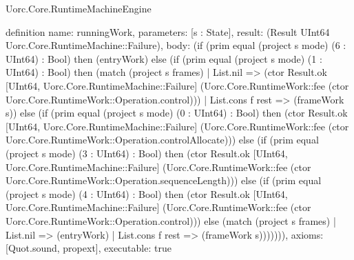 \begin{lexlean}{Uorc.Core.RuntimeMachineEngine}
\begin{semanticmodule}
definition{
  name: runningWork,
  parameters: [s : State],
  result: (Result UInt64 Uorc.Core.RuntimeMachine::Failure),
  body: (if (prim equal (project s mode) (6 : UInt64) : Bool) then (entryWork) else (if (prim equal (project s mode) (1 : UInt64) : Bool) then (match (project s frames)
    | List.nil => (ctor Result.ok [UInt64, Uorc.Core.RuntimeMachine::Failure] (Uorc.Core.RuntimeWork::fee (ctor Uorc.Core.RuntimeWork::Operation.control)))
    | List.cons f rest => (frameWork s)) else (if (prim equal (project s mode) (0 : UInt64) : Bool) then (ctor Result.ok [UInt64, Uorc.Core.RuntimeMachine::Failure] (Uorc.Core.RuntimeWork::fee (ctor Uorc.Core.RuntimeWork::Operation.controlAllocate))) else (if (prim equal (project s mode) (3 : UInt64) : Bool) then (ctor Result.ok [UInt64, Uorc.Core.RuntimeMachine::Failure] (Uorc.Core.RuntimeWork::fee (ctor Uorc.Core.RuntimeWork::Operation.sequenceLength))) else (if (prim equal (project s mode) (4 : UInt64) : Bool) then (ctor Result.ok [UInt64, Uorc.Core.RuntimeMachine::Failure] (Uorc.Core.RuntimeWork::fee (ctor Uorc.Core.RuntimeWork::Operation.control))) else (match (project s frames)
    | List.nil => (entryWork)
    | List.cons f rest => (frameWork s))))))),
  axioms: [Quot.sound, propext],
  executable: true
}


\end{semanticmodule}
\end{lexlean}
